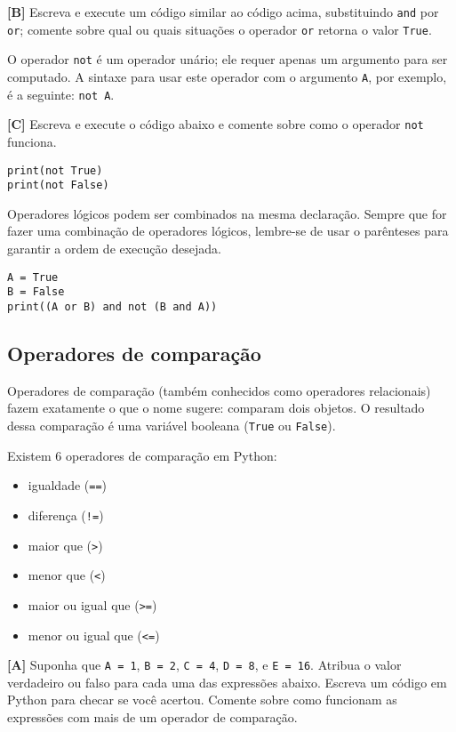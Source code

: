 \documentclass[11pt]{article}
\begin{document}
\textbf{[B]} Escreva e execute um código similar ao código acima, substituindo \texttt{and} por \texttt{or}; comente sobre qual ou quais situações o operador \texttt{or} retorna o valor \texttt{True}.

O operador \texttt{not} é um operador unário; ele requer apenas um argumento para ser computado. A sintaxe para usar este operador com o argumento \texttt{A}, por exemplo, é a seguinte: \texttt{not A}.

\textbf{[C]} Escreva e execute o código abaixo e comente sobre como o operador \texttt{not} funciona.

\begin{verbatim}
print(not True)
print(not False)
\end{verbatim}

Operadores lógicos podem ser combinados na mesma declaração. Sempre que for fazer uma combinação de operadores lógicos, lembre-se de usar o parênteses para garantir a ordem de execução desejada.

\begin{verbatim}
A = True
B = False
print((A or B) and not (B and A))
\end{verbatim}

\subsection{Operadores de comparação}
\label{sec:org31328ac}

Operadores de comparação (também conhecidos como operadores relacionais) fazem exatamente o que o nome sugere: comparam dois objetos. O resultado dessa comparação é uma variável booleana (\texttt{True} ou \texttt{False}).

Existem 6 operadores de comparação em Python:
\begin{itemize}
\item igualdade (\texttt{==})
\item diferença (\texttt{!=})
\item maior que (\texttt{>})
\item menor que (\texttt{<})
\item maior ou igual que (\texttt{>=})
\item menor ou igual que (\texttt{<=})
\end{itemize}

\textbf{[A]} Suponha que \texttt{A = 1}, \texttt{B = 2}, \texttt{C = 4}, \texttt{D = 8}, e \texttt{E = 16}. Atribua o valor verdadeiro ou falso para cada uma das expressões abaixo. Escreva um código em Python para checar se você acertou. Comente sobre como funcionam as expressões com mais de um operador de comparação.
\end{document}
